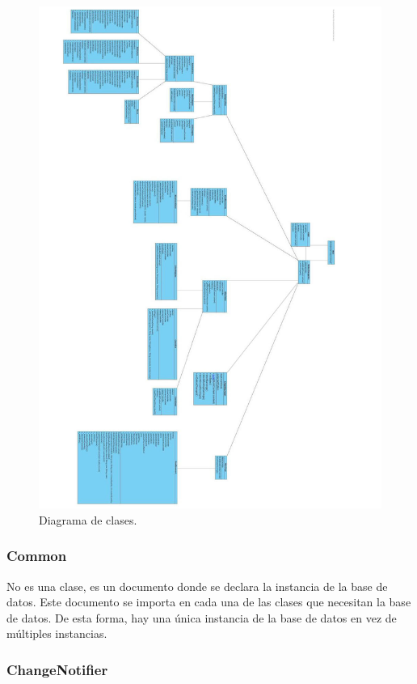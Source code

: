 \begin{figure}[H]
	\centering
	\includegraphics[width=1.1\textwidth, angle=180]{imagenes/imagenesDiagramas/diagramaClases.jpg}
	\caption{Diagrama de clases.}
	\label{fig:diagramaClases}
\end{figure}

\subsubsection{Common}

No es una clase, es un documento donde se declara la instancia de la base de datos. Este documento se importa en cada una de las clases que necesitan la base de datos. De esta forma, hay una única instancia de la base de datos en vez de múltiples instancias. 

\subsubsection{ChangeNotifier}

